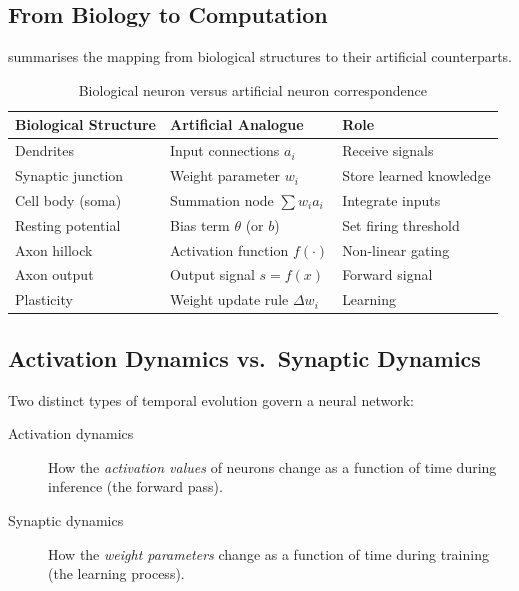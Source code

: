 \documentclass[12pt,a4paper]{article}
\begin{document}
\subsection{From Biology to Computation}
\label{subsec:bio-to-comp}

 summarises the mapping from biological structures
to their artificial counterparts.

\begin{table}[ht]
\centering
\caption{Biological neuron versus artificial neuron correspondence}
\label{tab:bio-artificial}
\begin{tabular}{lll}
\toprule
\textbf{Biological Structure} & \textbf{Artificial Analogue} & \textbf{Role} \\
\midrule
Dendrites             & Input connections $a_i$          & Receive signals \\
Synaptic junction     & Weight parameter $w_i$           & Store learned knowledge \\
Cell body (soma)      & Summation node $\sum w_i a_i$    & Integrate inputs \\
Resting potential     & Bias term $\theta$ (or $b$)      & Set firing threshold \\
Axon hillock          & Activation function $f(\cdot)$   & Non-linear gating \\
Axon output           & Output signal $s = f(x)$         & Forward signal \\
Plasticity            & Weight update rule $\Delta w_i$  & Learning \\
\bottomrule
\end{tabular}
\end{table}

\subsection{Activation Dynamics vs.\ Synaptic Dynamics}
\label{subsec:dynamics}

Two distinct types of temporal evolution govern a neural network:

\begin{description}
  \item[Activation dynamics] How the \emph{activation values} of neurons
        change as a function of time during inference (the forward pass).
  \item[Synaptic dynamics] How the \emph{weight parameters} change as a
        function of time during training (the learning process).
\end{description}
\end{document}
